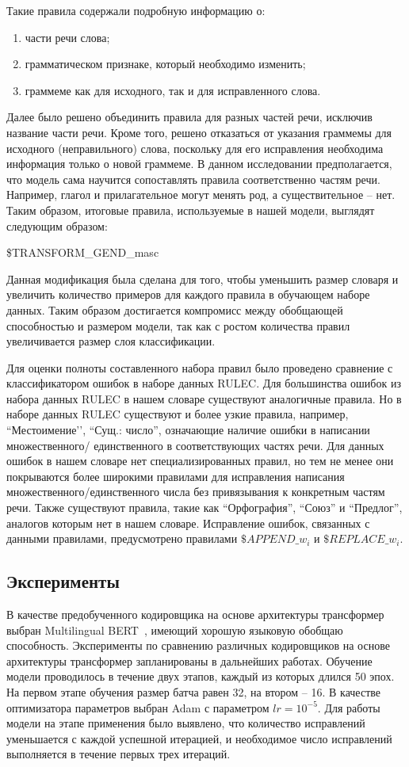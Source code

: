 Такие правила содержали подробную информацию о:
\begin{enumerate}
    \item части речи слова; 
    \item грамматическом признаке, который необходимо изменить; 
    \item граммеме как для исходного, так и для исправленного слова.
\end{enumerate}
 Далее было решено объединить правила для разных частей речи, исключив название части речи. Кроме того, решено отказаться от указания граммемы для исходного (неправильного) слова, поскольку для его исправления необходима информация только о новой граммеме. В данном исследовании предполагается, что модель сама научится сопоставлять правила соответственно частям речи. Например, глагол и прилагательное могут менять род, а существительное – нет. Таким образом, итоговые правила, используемые в нашей модели, выглядят следующим образом:
 \begin{center}
\$TRANSFORM\_GEND\_masc
\end{center}
Данная модификация была сделана для того, чтобы уменьшить размер словаря и увеличить количество примеров для каждого правила в обучающем наборе данных. Таким образом достигается компромисс между обобщающей способностью и размером модели, так как с ростом количества правил увеличивается размер слоя классификации. 

Для оценки полноты составленного набора правил было проведено сравнение с классификатором ошибок в наборе данных RULEC. Для большинства ошибок из набора данных RULEC в нашем словаре существуют аналогичные правила. Но в наборе данных RULEC существуют и более узкие правила, например, “Местоимение’’, “Сущ.: число”, означающие наличие ошибки в написании множественного/ единственного в соответствующих частях речи. Для данных ошибок в нашем словаре нет специализированных правил, но тем не менее они покрываются более широкими правилами для исправления написания множественного/единственного числа без привязывания к конкретным частям речи. Также существуют правила, такие как “Орфография”, “Союз” и “Предлог”, аналогов которым нет в нашем словаре. Исправление ошибок, связанных с данными правилами, предусмотрено правилами $\$APPEND\_w_i$ и $\$REPLACE\_w_i$.

\subsection{Эксперименты}
В качестве предобученного кодировщика на основе архитектуры трансформер выбран Multilingual BERT~\cite{b28}, имеющий хорошую языковую обобщаю способность. Эксперименты по сравнению различных кодировщиков на основе архитектуры трансформер запланированы в дальнейших работах. Обучение модели проводилось в течение двух этапов, каждый из которых длился 50 эпох. На первом этапе обучения размер батча равен 32, на втором – 16. В качестве оптимизатора параметров выбран Adam с параметром $lr=10^{-5}$. 
Для работы модели на этапе применения было выявлено, что количество исправлений уменьшается с каждой успешной итерацией, и необходимое число исправлений выполняется в течение первых трех итераций. 

